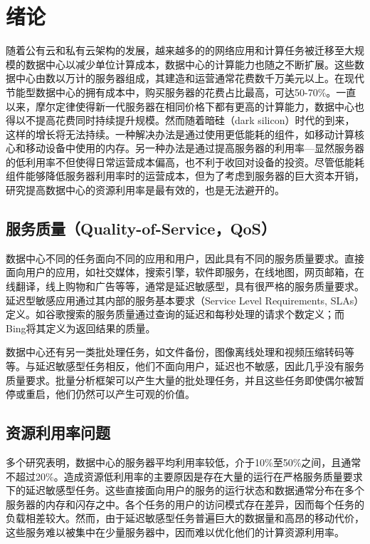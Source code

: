 
\chapter{绪论}
随着公有云和私有云架构的发展，越来越多的的网络应用和计算任务被迁移至大规模的数据中心以减少单位计算成本，数据中心的计算能力也随之不断扩展。这些数据中心由数以万计的服务器组成，其建造和运营通常花费数千万美元以上。在现代节能型数据中心的拥有成本中，购买服务器的花费占比最高，可达50-70\%\cite{barroso2013datacenter}。一直以来，摩尔定律使得新一代服务器在相同价格下都有更高的计算能力，数据中心也得以不提高花费同时持续提升规模。然而随着暗硅（dark silicon）时代的到来\cite{esmaeilzadeh2011dark}\cite{hardavellas2011toward}，这样的增长将无法持续。一种解决办法是通过使用更低能耗的组件\cite{lo2014towards}，如移动计算核心\cite{janapa2010web}和移动设备中使用的内存\cite{malladi2012towards}。另一种办法是通过提高服务器的利用率---显然服务器的低利用率不但使得日常运营成本偏高，也不利于收回对设备的投资。尽管低能耗组件能够降低服务器利用率时的运营成本\cite{barroso2007case}，但为了考虑到服务器的巨大资本开销，研究提高数据中心的资源利用率是最有效的，也是无法避开的。

\section{服务质量（Quality-of-Service，QoS）}
数据中心不同的任务面向不同的应用和用户，因此具有不同的服务质量要求。直接面向用户的应用，如社交媒体，搜索引擎，软件即服务，在线地图，网页邮箱，在线翻译，线上购物和广告等等，通常是延迟敏感型，具有很严格的服务质量要求。延迟型敏感应用通过其内部的服务基本要求（Service Level Requirements, SLAs）定义。如谷歌搜索的服务质量通过查询的延迟和每秒处理的请求个数定义；而Bing将其定义为返回结果的质量\cite{janapa2010web}\cite{kozyrakis2010server}。

数据中心还有另一类批处理任务，如文件备份，图像离线处理和视频压缩转码等等。与延迟敏感型任务相反，他们不面向用户，延迟也不敏感，因此几乎没有服务质量要求。批量分析框架可以产生大量的批处理任务，并且这些任务即使偶尔被暂停或重启，他们仍然可以产生可观的价值\cite{boutin2014apollo}\cite{carvalho2014long}\cite{curino2014reservation}\cite{delimitrou2014quasar}。

\section{资源利用率问题}
多个研究表明，数据中心的服务器平均利用率较低，介于10\%至50\%之间\cite{kaplan2008revolutionizing}\cite{vasan2010worth}\cite{reiss2012heterogeneity}\cite{barroso2013datacenter}\cite{delimitrou2014quasar}\cite{carvalho2014long}，且通常不超过20\%\cite{barroso2007case}。造成资源低利用率的主要原因是存在大量的运行在严格服务质量要求下的延迟敏感型任务。这些直接面向用户的服务的运行状态和数据通常分布在多个服务器的内存和闪存之中。各个任务的用户的访问模式存在差异，因而每个任务的负载相差较大。然而，由于延迟敏感型任务普遍巨大的数据量和高昂的移动代价，这些服务难以被集中在少量服务器中，因而难以优化他们的计算资源利用率。

